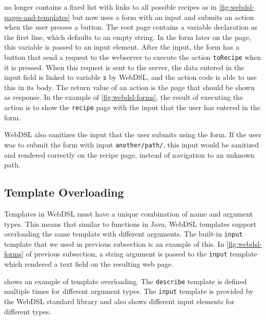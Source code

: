        no longer contains a fixed list with links to all possible recipes as in \cref{fig:webdsl-pages-and-templates} but now uses a form with an input and submits an action when the user presses a button. The root page contains a variable declaration as the first line, which defaults to an empty string. In the form later on the page, this variable is passed to an input element. After the input, the form has a button that send a request to the webserver to execute the action \texttt{toRecipe} when it is pressed. When this request is sent to the server, the data entered in the input field is linked to variable \texttt{s} by WebDSL, and the action code is able to use this in its body. The return value of an action is the page that should be shown as response. In the example of \cref{fig:webdsl-forms}, the result of executing the action is to show the \texttt{recipe} page with the input that the user has entered in the form.

      WebDSL also sanitizes the input that the user submits using the form. If the user was to submit the form with input \texttt{another/path/}, this input would be sanitized and rendered correctly on the recipe page, instead of navigation to an unknown path.

    \subsection{\label{subsec:template-overloading}Template Overloading}

      Templates in WebDSL must have a unique combination of name and argument types. This means that similar to functions in Java, WebDSL templates support overloading the same template with different arguments. The built-in \texttt{input} template that we used in previous subsection is an example of this. In \cref{fig:webdsl-forms} of previous subsection, a string argument is passed to the \texttt{input} template which rendered a text field on the resulting web page.

       shows an example of template overloading. The \texttt{describe} template is defined multiple times for different argument types. The \texttt{input} template is provided by the WebDSL standard library and also shows different input elements for different types.

